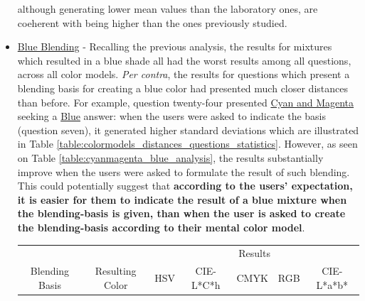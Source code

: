 \begin{itemize}
  although generating lower mean values than the laboratory ones, are coeherent with being higher than the ones previously studied.
  \item \ul{Blue Blending} - Recalling the previous analysis, the results for mixtures which resulted in a blue shade all had the worst results among all questions, across all color models. \emph{Per contra}, the
  results for questions which present a blending basis for creating a blue color had presented much closer distances than before. For example, question twenty-four presented \ul{Cyan and Magenta} seeking a \ul{Blue}
  answer: when the users were asked to indicate the basis (question seven), it generated higher standard deviations which are illustrated in Table \ref{table:colormodels_distances_questions_statistics}. However, as
  seen on Table \ref{table:cyanmagenta_blue_analysis}, the results substantially improve when the users were asked to formulate the result of such blending. \\
  This could potentially suggest that \textbf{according to the users' expectation, it is easier for them to indicate the result of a blue mixture when the blending-basis is given, than when the user is asked
  to create the blending-basis according to their mental color model}.
  \begin{table}[H]
    \resizebox{\textwidth}{!} {
    \begin{tabular}{ccccccccccccc}
      \hline
      \multicolumn{2}{c}{}                                        &                                                          & \multicolumn{10}{c}{Results}                                                                                                                                                                                                                                                                                                                                                                                                                                                                                                                                                             \\ \cline{4-13}
      \multicolumn{2}{c}{\multirow{-2}{*}{Blending Basis}}        & \multirow{-2}{*}{Resulting Color}                        & \multicolumn{2}{c}{HSV}                                                                                              & \multicolumn{2}{c}{CIE-L*C*h}                                                                                        & \multicolumn{2}{c}{CMYK}                                                                                             & \multicolumn{2}{c}{RGB}                                                                                              & \multicolumn{2}{c}{CIE-L*a*b*}                                                               \\ \hline

\end{tabular}}
\end{table}
\end{itemize}
